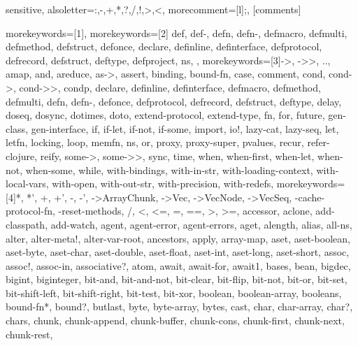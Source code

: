\usepackage{listings}
\usepackage{color}
\usepackage{xcolor}

{sensitive, %
 alsoletter={:,-,+,*,?,/,!,>,<}, %
 morecomment=[l];, %
}[comments]

%
{%
 morekeywords=[1]{},
 morekeywords=[2]{%
   def, def-, defn, defn-, defmacro, defmulti, defmethod, %
   defstruct, defonce, declare, definline, definterface, %
   defprotocol, defrecord, defstruct, deftype, defproject, ns, %
 }, %
 morekeywords=[3]{->, ->>, .., amap, and, areduce, as->, assert, binding, %
   bound-fn, case, comment, cond, cond->, cond->>, condp, declare, definline, %
   definterface, defmacro, defmethod, defmulti, defn, defn-, defonce, %
   defprotocol, defrecord, defstruct, deftype, delay, doseq, dosync, dotimes, %
   doto, extend-protocol, extend-type, fn, for, future, gen-class, %
   gen-interface, if, if-let, if-not, if-some, import, io!, lazy-cat, lazy-seq, let, %
   letfn, locking, loop, memfn, ns, or, proxy, proxy-super, pvalues, %
   recur, refer-clojure, reify, some->, some->>, sync, time, when, when-first, %
   when-let, when-not, when-some, while, with-bindings, with-in-str, %
   with-loading-context, with-local-vars, with-open, with-out-str, %
   with-precision, with-redefs}, %
  morekeywords=[4]{*, *', +, +', -, -', ->ArrayChunk, ->Vec, ->VecNode, %
    ->VecSeq, -cache-protocol-fn, -reset-methods, /, <, <=, =, ==, >, >=, %
    accessor, aclone, add-classpath, add-watch, agent, agent-error, %
    agent-errors, aget, alength, alias, all-ns, alter, alter-meta!, %
    alter-var-root, ancestors, apply, array-map, aset, aset-boolean, aset-byte, %
    aset-char, aset-double, aset-float, aset-int, aset-long, aset-short, assoc, %
    assoc!, assoc-in, associative?, atom, await, await-for, await1, bases, bean, %
    bigdec, bigint, biginteger, bit-and, bit-and-not, bit-clear, bit-flip, %
    bit-not, bit-or, bit-set, bit-shift-left, bit-shift-right, bit-test, %
    bit-xor, boolean, boolean-array, booleans, bound-fn*, bound?, butlast, byte, %
    byte-array, bytes, cast, char, char-array, char?, chars, chunk, %
    chunk-append, chunk-buffer, chunk-cons, chunk-first, chunk-next, chunk-rest, %
}}

